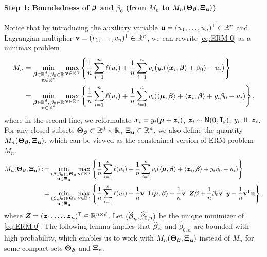 \paragraph{Step 1: Boundedness of ${\boldsymbol{\beta}}$ and $\beta_0$ (from $M_{n}$ to $M_n(\text{\boldmath $\Theta$}_{{\boldsymbol{\beta}}}, \text{\boldmath $\Xi$}_{\mathrm{\bf u}})$)}
Notice that by introducing the auxiliary variable $\mathrm{\bf u} = (u_1, \ldots, u_n)^{\sf T} \in \mathbb{R}^n$ and Lagrangian multiplier $\mathrm{\bf v} = (v_1, \ldots, v_n)^{\sf T} \in \mathbb{R}^n$, we can rewrite \cref{eq:ERM-0} as a minimax problem
\begin{align*}
        M_n & = \min_{ \substack{ \text{\boldmath $\beta$} \in \mathbb{R}^d, \, \beta_0 \in \mathbb{R} \\  \mathrm{\bf u} \in \mathbb{R}^n } }
        \max_{ \mathrm{\bf v} \in \mathbb{R}^n }
        \left\{
        \frac1n \sum_{i=1}^n \ell( u_i )
         + \frac{1}{n} \sum_{i=1}^n v_i \bigl(  y_i(\langle \text{\boldmath $x$}_i, \text{\boldmath $\beta$} \rangle +  \beta_0 ) - u_i\bigr)
         \right\} 
         \\
         & = \min_{ \substack{ \text{\boldmath $\beta$} \in \mathbb{R}^d, \, \beta_0 \in \mathbb{R} \\  \mathrm{\bf u} \in \mathbb{R}^n } }
         \max_{ \mathrm{\bf v} \in \mathbb{R}^n }
         \left\{
         \frac1n \sum_{i=1}^n \ell( u_i )
          + \frac{1}{n} \sum_{i=1}^n v_i (  \langle \text{\boldmath $\mu$}, {\boldsymbol{\beta}} \rangle +  \langle \text{\boldmath $z$}_i, {\boldsymbol{\beta}} \rangle + y_i \beta_0 - u_i )
          \right\},
\end{align*}
where in the second line, we reformulate $\text{\boldmath $x$}_i = y_i({\boldsymbol{\mu}} + \text{\boldmath $z$}_i)$, $\text{\boldmath $z$}_i \sim {\sf N}(\mathrm{\bf 0}, \mathrm{\bf I}_d)$, $y_i \perp\!\!\!\perp \text{\boldmath $z$}_i$. For any closed subsets $\text{\boldmath $\Theta$}_{{\boldsymbol{\beta}}} \subset \mathbb{R}^{d} \times \mathbb{R}$, $\text{\boldmath $\Xi$}_{\mathrm{\bf u}} \subset \mathbb{R}^{n}$, we also define the quantity $M_n(\text{\boldmath $\Theta$}_{{\boldsymbol{\beta}}}, \text{\boldmath $\Xi$}_{\mathrm{\bf u}})$, which can be viewed as the constrained version of ERM problem $M_n$.
\begin{equation}
    \label{eq:Mn}
    \begin{aligned}
        M_n(\bTheta_{\vbeta}, \bXi_{\bu})
        :\! & = \min_{ \substack{ (\bbeta , \beta_0) \in \bTheta_{\vbeta} \\  \bu \in \bXi_{\bu} } }
    \max_{ \bv \in \R^n }
    \left\{
    \frac1n \sum_{i=1}^n \ell( u_i )
     + \frac{1}{n} \sum_{i=1}^n v_i (  \< \bmu, \vbeta \> +  \< \zz_i, \vbeta \> + y_i \beta_0 - u_i )
     \right\} \\
     & = \min_{ \substack{ (\bbeta , \beta_0) \in \bTheta_{\vbeta} \\  \bu \in \bXi_{\bu} } }
     \max_{ \bv \in \R^n }
     \left\{
     \frac1n \sum_{i=1}^n \ell( u_i )
      + \frac1n \bv^\top \bone \< \bmu, \vbeta \>
      + \frac1n \bv^\top \ZZ \vbeta + \frac1n \beta_0 \bv^\top \yy - \frac1n \bv^\top \bu
      \right\},
    \end{aligned}
\end{equation}
where $\text{\boldmath $Z$} = (\text{\boldmath $z$}_1, \ldots, \text{\boldmath $z$}_n)^{\sf T} \in \mathbb{R}^{n \times d}$. Let $(\widehat{{\boldsymbol{\beta}}}_n, \widehat\beta_{0, n})$ be the unique minimizer of \cref{eq:ERM-0}. The following lemma implies that $\widehat{{\boldsymbol{\beta}}}_n$ and $\hat\beta_{0, n}$ are bounded with high probability, which enables us to work with $M_n(\text{\boldmath $\Theta$}_{{\boldsymbol{\beta}}}, \text{\boldmath $\Xi$}_{\mathrm{\bf u}})$ instead of $M_n$ for some compact sets $\text{\boldmath $\Theta$}_{{\boldsymbol{\beta}}}$ and $\text{\boldmath $\Xi$}_{\mathrm{\bf u}}$.

